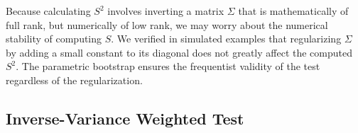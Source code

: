 \documentclass[letter,12pt]{article}
\begin{document}
Because calculating \(S^2\) involves inverting a matrix \(\Sigma\) that is mathematically of full rank, but numerically of low rank, we may worry about the numerical stability of computing \(S\).
We verified in simulated examples that regularizing \(\Sigma\) by adding a small constant to its diagonal does not greatly affect the computed \(S^2\).
The parametric bootstrap ensures the frequentist validity of the test
regardless of the regularization.



\hypertarget{inverse-variance-weighted-test}{%
\subsection{Inverse-Variance Weighted Test}\label{inverse-variance-weighted-test}}
\end{document}
